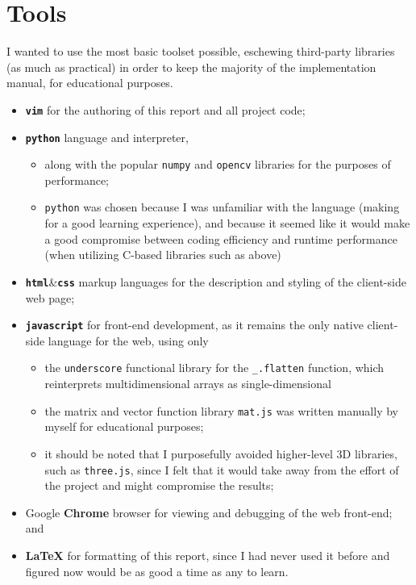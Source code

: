 \section{Tools}
I wanted to use the most basic toolset possible, eschewing third-party libraries (as much as practical) in order to keep the majority of the implementation manual, for educational purposes.
\begin{itemize}
\item \textbf{\texttt{vim}} for the authoring of this report and all project code;
\item \textbf{\texttt{python}} language and interpreter,
    \begin{itemize}
    \item along with the popular \verb!numpy! and \verb!opencv! libraries for the purposes of performance;
    \item \verb!python! was chosen because I was unfamiliar with the language (making for a good learning experience), and because it seemed like it would make a good compromise between coding efficiency and runtime performance (when utilizing C-based libraries such as above)
    \end{itemize}
\item \textbf{\texttt{html}}\&\textbf{\texttt{css}} markup languages for the description and styling of the client-side web page;
\item \textbf{\texttt{javascript}} for front-end development, as it remains the only native client-side language for the web, using only
    \begin{itemize}
    \item the \verb!underscore! functional library for the \verb!_.flatten! function, which reinterprets multidimensional arrays as single-dimensional
    \item the matrix and vector function library \verb!mat.js! was written manually by myself for educational purposes;
    \item it should be noted that I purposefully avoided higher-level 3D libraries, such as \verb!three.js!, since I felt that it would take away from the effort of the project and might compromise the results;
    \end{itemize}
\item Google \textbf{Chrome} browser for viewing and debugging of the web front-end; and
\item \textbf{\LaTeX} for formatting of this report, since I had never used it before and figured now would be as good a time as any to learn.
\end{itemize}
